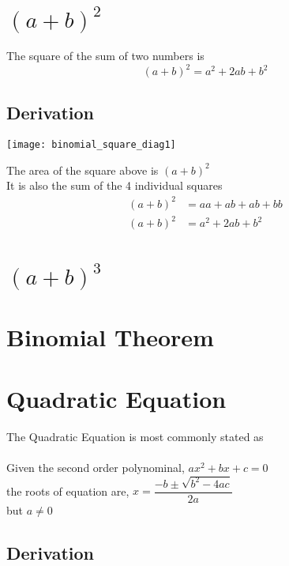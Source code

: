 \documentclass[11pt]{book}
\begin{document}
\section{$(a+b)^2$}
The square of the sum of two numbers is
\[(a+b)^2 = a^2 +2ab +b^2\]

\subsection{Derivation}
\begin{center}
\texttt{[image: binomial\_square\_diag1]}
\end{center}
The area of the square above is \((a+b)^2\) \\
It is also the sum of the 4 individual squares\\
\begin{align*}
(a+b)^2 &= aa + ab + ab + bb\\
(a+b)^2 &= a^2 +2ab + b^2
\end{align*}

\section{$(a+b)^3$}

\section{Binomial Theorem}

\section{Quadratic Equation}
The Quadratic Equation is most commonly stated as \\\\
Given the second order polynominal, \(ax^2 + bx + c = 0\)\\
the roots of equation are, \(x = \dfrac{-b \pm \sqrt{b^2 -4ac}}{2a}\) \\
but \(a \ne 0\)

\subsection{Derivation}
\end{document}
